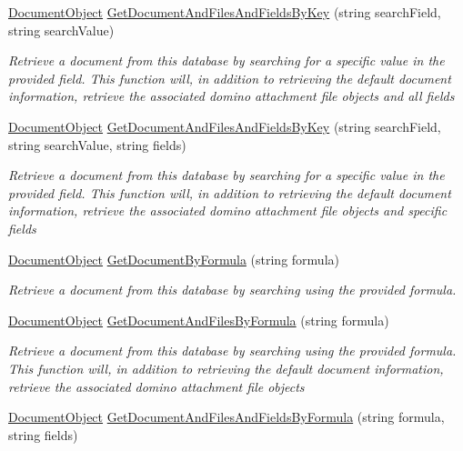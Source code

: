 \begin{DoxyCompactItemize}
\mbox{\hyperlink{class_document_object}{Document\+Object}} \mbox{\hyperlink{class_database_object_a6fb63750e0d3ecb2393c8d416122f5d9}{Get\+Document\+And\+Files\+And\+Fields\+By\+Key}} (string search\+Field, string search\+Value)
\begin{DoxyCompactList}\small\item\em Retrieve a document from this database by searching for a specific value in the provided field. This function will, in addition to retrieving the default document information, retrieve the associated domino attachment file objects and all fields \end{DoxyCompactList}\item 
\mbox{\hyperlink{class_document_object}{Document\+Object}} \mbox{\hyperlink{class_database_object_a995e2ce483797f6e53607435d58da7c4}{Get\+Document\+And\+Files\+And\+Fields\+By\+Key}} (string search\+Field, string search\+Value, string fields)
\begin{DoxyCompactList}\small\item\em Retrieve a document from this database by searching for a specific value in the provided field. This function will, in addition to retrieving the default document information, retrieve the associated domino attachment file objects and specific fields \end{DoxyCompactList}\item 
\mbox{\hyperlink{class_document_object}{Document\+Object}} \mbox{\hyperlink{class_database_object_ae5477aedfcd0d54b21017faa1389bc71}{Get\+Document\+By\+Formula}} (string formula)
\begin{DoxyCompactList}\small\item\em Retrieve a document from this database by searching using the provided formula. \end{DoxyCompactList}\item 
\mbox{\hyperlink{class_document_object}{Document\+Object}} \mbox{\hyperlink{class_database_object_a1d35f51baee4be6adb69a954efe5b4bf}{Get\+Document\+And\+Files\+By\+Formula}} (string formula)
\begin{DoxyCompactList}\small\item\em Retrieve a document from this database by searching using the provided formula. This function will, in addition to retrieving the default document information, retrieve the associated domino attachment file objects \end{DoxyCompactList}\item 
\mbox{\hyperlink{class_document_object}{Document\+Object}} \mbox{\hyperlink{class_database_object_ac158fa645a9ab75299dd3249576e3893}{Get\+Document\+And\+Files\+And\+Fields\+By\+Formula}} (string formula, string fields)

\end{DoxyCompactItemize}
